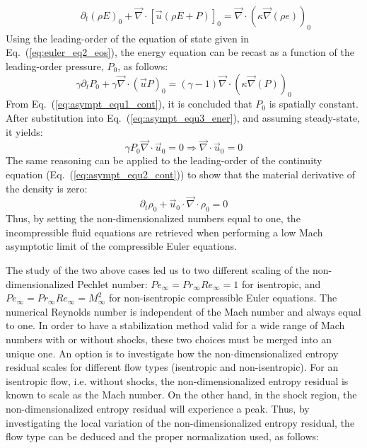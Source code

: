 \documentclass[preprint,10pt]{elsarticle}
\renewcommand{\div}{\vec{\nabla}\! \cdot \!}
\newcommand{\grad}{\vec{\nabla}}
\newcommand{\eqt}[1]{Eq.~(\ref{#1})}                     %
\begin{document}
\begin{itemize}
\begin{subequations}
\begin{eqnarray}
  \end{eqnarray}
  \begin{eqnarray}\label{eq:asympt_equ2_ener}
 &&\partial_t(\rho E)_0 + \div \left[ \vec{u} (\rho E + P) \right]_0 = \div(\kappa \grad(\rho e))_0
  \end{eqnarray}
 \end{subequations}
 Using the leading-order of the equation of state given in \eqt{eq:euler_eq2_eos}, the energy equation can be recast as a function of the leading-order pressure, $P_0$, as follows:
 \begin{equation}\label{eq:asympt_equ3_ener}
 \gamma \partial_t P_0 + \gamma \div \left( \vec{u} P \right)_0 = \left( \gamma-1 \right)\div(\kappa \grad(P))_0
 \end{equation}
 From \eqt{eq:asympt_equ1_cont}, it is concluded that $P_0$ is spatially constant. After substitution into \eqt{eq:asympt_equ3_ener}, and assuming steady-state, it yields:
 \begin{equation}
\gamma P_0 \div  \vec{u}_0 = 0 \Rightarrow \div  \vec{u}_0 = 0
 \end{equation}
The same reasoning can be applied to the leading-order of the continuity equation (\eqt{eq:asympt_equ2_cont}) to show that the material derivative of the density is zero:
\begin{equation}
\partial_t \rho_0 + \vec{u}_0 \cdot \div \rho_0 = 0
\end{equation}
Thus, by setting the non-dimensionalized numbers equal to one, the incompressible fluid equations are retrieved when performing a low Mach asymptotic limit of the compressible Euler equations.
\end{itemize}
The study of the two above cases led us to two different scaling of the non-dimensionalized Pechlet number: $Pe_{\infty} = Pr_{\infty} Re_{\infty} = 1$ for isentropic, and$Pe_{\infty}  = Pr_{\infty} Re_{\infty} = M_{\infty}^2$ for non-isentropic compressible Euler equations. The numerical Reynolds number is independent of the Mach number and always equal to one. In order to have a stabilization method valid for a wide range of Mach numbers with or without shocks, these two choices must be merged into an unique one. An option is to investigate how the non-dimensionalized entropy residual scales for different flow types (isentropic and non-isentropic). For an isentropic flow, i.e. without shocks, the non-dimensionalized entropy residual is known to scale as the Mach number. On the other hand, in the shock region, the non-dimensionalized entropy residual will experience a peak. Thus, by investigating the local variation of the non-dimensionalized entropy residual, the flow type can be deduced and the proper normalization used, as follows:
\end{document}
